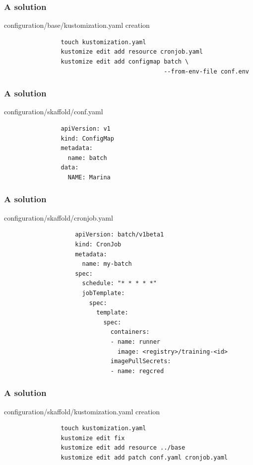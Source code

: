 	\begin{frame}[fragile]
		\frametitle{A solution}

		\begin{block}{configuration/base/kustomization.yaml creation}
			\begin{verbatim}
				touch kustomization.yaml
				kustomize edit add resource cronjob.yaml
				kustomize edit add configmap batch \
				                             --from-env-file conf.env
			\end{verbatim}
		\end{block}
	\end{frame}
	
	\begin{frame}[fragile]
		\frametitle{A solution}
		
		\begin{block}{configuration/skaffold/conf.yaml}
			\begin{verbatim}
				apiVersion: v1
				kind: ConfigMap
				metadata:
				  name: batch
				data:
				  NAME: Marina
			\end{verbatim}
		\end{block}
	\end{frame}
	
	\begin{frame}[fragile]
		\frametitle{A solution}
		
		\begin{block}{configuration/skaffold/cronjob.yaml}
		\begin{tiny}
				\begin{verbatim}
					apiVersion: batch/v1beta1
					kind: CronJob
					metadata:
					  name: my-batch
					spec:
					  schedule: "* * * * *"
					  jobTemplate:
					    spec:
					      template:
					        spec:
					          containers:
					          - name: runner
					            image: <registry>/training-<id>
					          imagePullSecrets:
					          - name: regcred
				\end{verbatim}
			\end{tiny}
		\end{block}
	\end{frame}
	
	\begin{frame}[fragile]
		\frametitle{A solution}
		
		\begin{block}{configuration/skaffold/kustomization.yaml creation}
			\begin{verbatim}
				touch kustomization.yaml
				kustomize edit fix
				kustomize edit add resource ../base
				kustomize edit add patch conf.yaml cronjob.yaml
			\end{verbatim}
		\end{block}
	\end{frame}
	
